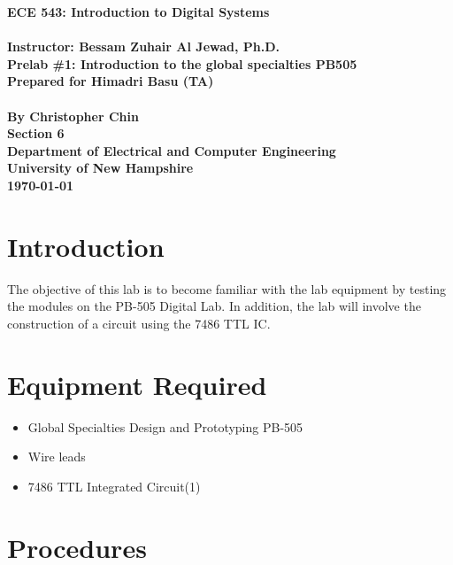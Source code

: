 \documentclass[11pt,a4paper]{article}
\begin{document}
\begin{center}
\textbf{
    \Large{ECE 543: Introduction to Digital Systems}
    \\~\\
    \large{Instructor: Bessam Zuhair Al Jewad, Ph.D.}
    \\[1.25in]
    \LARGE{Prelab \#1: Introduction to the global specialties PB505}
    \\[0.62in]
    \large{Prepared for Himadri Basu (TA)\\~\\By Christopher Chin}
    \\[1.25in]
    \LARGE{Section 6}
    \\[1.25in]
    \Large{Department of Electrical and Computer Engineering\\
           University of New Hampshire}
    \\[1.25in]
    \Large{\today}
}
\end{center}
\clearpage
{}

\tableofcontents
\pagebreak

\section{Introduction}
The objective of this lab is to become familiar with the lab equipment by testing the modules on
the PB-505 Digital Lab. In addition, the lab will involve the construction of a circuit using the
7486 TTL IC\@.
\section{Equipment Required}
\begin{itemize}
    \item Global Specialties Design and Prototyping PB-505
    \item Wire leads
    \item 7486 TTL Integrated Circuit(1)
\end{itemize}
\section{Procedures}
\end{document}
